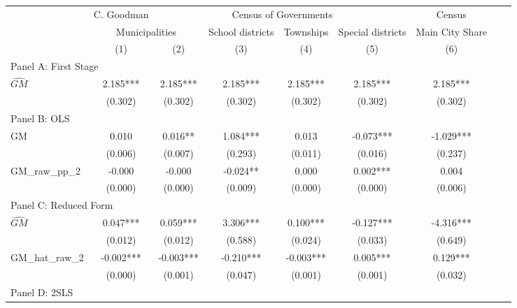  \begin{tabular}{l*{8}{c}} \toprule
&\multicolumn{1}{c}{C. Goodman}&\multicolumn{4}{c}{Census of Governments}&\multicolumn{1}{c}{Census}\\\cmidrule(lr){2-2}\cmidrule(lr){3-6}\cmidrule(lr){7-7}
&\multicolumn{2}{c}{Municipalities}&\multicolumn{1}{c}{School districts}&\multicolumn{1}{c}{Townships}&\multicolumn{1}{c}{Special districts}&\multicolumn{1}{c}{Main City Share}\\\cmidrule(lr){2-3}\cmidrule(lr){4-6}\cmidrule(lr){7-7}
&\multicolumn{1}{c}{(1)}&\multicolumn{1}{c}{(2)}&\multicolumn{1}{c}{(3)}&\multicolumn{1}{c}{(4)}&\multicolumn{1}{c}{(5)}&\multicolumn{1}{c}{(6)}\\
\cmidrule(lr){1-7}
\multicolumn{6}{l}{Panel A: First Stage}\\
\cmidrule(lr){1-7}
$\widehat{GM}$  &    2.185***&    2.185***&    2.185***&    2.185***&    2.185***&    2.185***\\
                &  (0.302)   &  (0.302)   &  (0.302)   &  (0.302)   &  (0.302)   &  (0.302)   \\
\cmidrule(lr){1-7}
\multicolumn{6}{l}{Panel B: OLS}\\
\cmidrule(lr){1-7}
GM              &    0.010   &    0.016** &    1.084***&    0.013   &   -0.073***&   -1.029***\\
                &  (0.006)   &  (0.007)   &  (0.293)   &  (0.011)   &  (0.016)   &  (0.237)   \\
\addlinespace
GM\_raw\_pp\_2     &   -0.000   &   -0.000   &   -0.024** &    0.000   &    0.002***&    0.004   \\
                &  (0.000)   &  (0.000)   &  (0.009)   &  (0.000)   &  (0.000)   &  (0.006)   \\
\cmidrule(lr){1-7}
\multicolumn{6}{l}{Panel C: Reduced Form}\\
\cmidrule(lr){1-7}
$\widehat{GM}$  &    0.047***&    0.059***&    3.306***&    0.100***&   -0.127***&   -4.316***\\
                &  (0.012)   &  (0.012)   &  (0.588)   &  (0.024)   &  (0.033)   &  (0.649)   \\
\addlinespace
GM\_hat\_raw\_2    &   -0.002***&   -0.003***&   -0.210***&   -0.003***&    0.005***&    0.129***\\
                &  (0.000)   &  (0.001)   &  (0.047)   &  (0.001)   &  (0.001)   &  (0.032)   \\
\cmidrule(lr){1-7}
\multicolumn{6}{l}{Panel D: 2SLS}\\
\cmidrule(lr){1-7}

\end{tabular}
